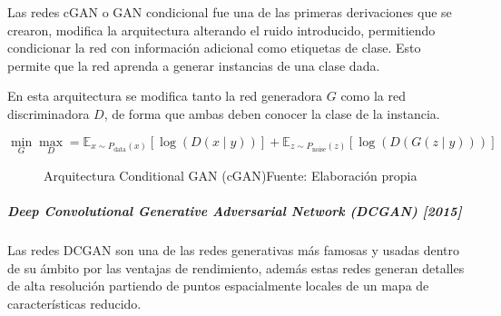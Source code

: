 
Las redes \gls{cGAN} \cite{cGAN-mirza2014conditional,cGAN-zheng2021continuous,cGAN-li2022ttscgan,cGAN} o GAN condicional fue una de las primeras derivaciones que se crearon, modifica la arquitectura alterando el ruido introducido, permitiendo condicionar la red con información adicional como etiquetas de clase. Esto permite que la red aprenda a generar instancias de una clase dada.

En esta arquitectura se modifica tanto la red generadora ${G}$ como la red discriminadora ${D}$, de forma que ambas deben conocer la clase de la instancia.

\begin{equation}
    \min_{G}\max_{D}
    = \mathbb{E}_{x\sim{}P_{\text{data}}(x)}   \left[ \log{\left( D(x\mid{}y)     \right)} \right]
    + \mathbb{E}_{z\sim{}P_{\text{noise}}(z)}  \left[ \log{\left( D(G(z\mid{}y))  \right)} \right]
\end{equation}

\begin{figure}[H]
    \centering
    \centerline{}
    \caption{Arquitectura Conditional GAN (\gls{cGAN})\newline{}Fuente: Elaboración propia}
    \label{fig:cGAN}
\end{figure}

\subparagraph*{Deep Convolutional Generative Adversarial Network (DCGAN) [2015]}
Las redes \gls{DCGAN} \cite{DCGAN-radford2016unsupervised,DCGAN-viola2020faultface,DCGAN-aslan2019deep,DCGAN-curto2020highresolution} son una de las redes generativas más famosas y usadas dentro de su ámbito por las ventajas de rendimiento, además estas redes generan detalles de alta resolución partiendo de puntos espacialmente locales de un mapa de características reducido.


